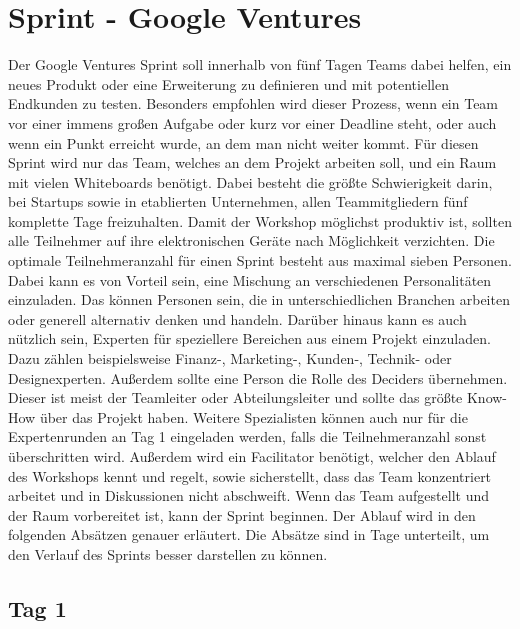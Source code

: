 \section{Sprint - Google Ventures}
\label{sec:Sprint-Grundlagen}
Der Google Ventures Sprint soll innerhalb von fünf Tagen Teams dabei helfen, ein neues Produkt oder eine Erweiterung zu definieren und mit potentiellen Endkunden zu testen. Besonders empfohlen wird dieser Prozess, wenn ein Team vor einer immens großen Aufgabe oder kurz vor einer Deadline steht, oder auch wenn ein Punkt erreicht wurde, an dem man nicht weiter kommt. Für diesen Sprint wird nur das Team, welches an dem Projekt arbeiten soll, und ein Raum mit vielen Whiteboards benötigt. Dabei besteht die größte Schwierigkeit darin, bei Startups sowie in etablierten Unternehmen, allen Teammitgliedern fünf komplette Tage freizuhalten. Damit der Workshop möglichst produktiv ist, sollten alle Teilnehmer auf ihre elektronischen Geräte nach Möglichkeit verzichten. Die optimale Teilnehmeranzahl für einen Sprint besteht aus maximal sieben Personen. Dabei kann es von Vorteil sein, eine Mischung an verschiedenen Personalitäten einzuladen. Das können Personen sein, die in unterschiedlichen Branchen arbeiten oder generell alternativ denken und handeln. Darüber hinaus kann es auch nützlich sein, Experten für speziellere Bereichen aus einem Projekt einzuladen. Dazu zählen beispielsweise Finanz-, Marketing-, Kunden-, Technik- oder Designexperten. Außerdem sollte eine Person die Rolle des Deciders übernehmen. Dieser ist meist der Teamleiter oder Abteilungsleiter und sollte das größte Know-How über das Projekt haben. Weitere Spezialisten können auch nur für die Expertenrunden an Tag 1 eingeladen werden, falls die Teilnehmeranzahl sonst überschritten wird. Außerdem wird ein Facilitator benötigt, welcher den Ablauf des Workshops kennt und regelt, sowie sicherstellt, dass das Team konzentriert arbeitet und in Diskussionen nicht abschweift. Wenn das Team aufgestellt und der Raum vorbereitet ist, kann der Sprint beginnen. Der Ablauf wird in den folgenden Absätzen genauer erläutert. Die Absätze sind in Tage unterteilt, um den Verlauf des Sprints besser darstellen zu können.

\subsection*{\label{sec:Sprint-Tag1}\thesubsection\quad Tag 1}
